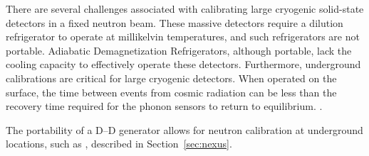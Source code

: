 There are several challenges associated with calibrating large cryogenic solid-state detectors in a fixed neutron beam.  These massive detectors require a dilution refrigerator to operate at millikelvin temperatures, and such refrigerators are not portable.  Adiabatic Demagnetization Refrigerators, although portable, lack the cooling capacity to effectively operate these detectors. Furthermore, underground calibrations are critical for large cryogenic detectors. When operated on the surface, the time between events from cosmic radiation can be less than the recovery time required for the phonon sensors to return to equilibrium. .

The portability of a D--D generator allows for neutron calibration at underground locations, such as \nexus, described in Section~\ref{sec:nexus}. 



